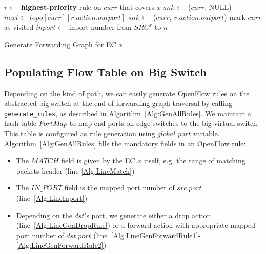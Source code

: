 \begin{algorithm}[t]
\DontPrintSemicolon
{}
 {
         {
                $r \gets$ \textbf{highest-priority} rule on $curr$ that covers $x$\;
                 {\label{Alg:LineDropPath1}
                        $snk \gets$ ($curr$, NULL)\;
                        \;
                        \KwRet\;
                }\label{Alg:LineDropPath2}
                $next \gets topo[curr][r.action.outport]$\;
                 {\label{Alg:LineForwardPath1}
                        $snk \gets$ ($curr$, $r.action.outport$)\;
                        \;
                        \KwRet\;
                }\label{Alg:LineForwardPath2}
                mark $curr$ as visited\;
                \;
        }
}\;
 {\label{Alg:LineStartDFS1}
         {
                $inport \gets$ inport number from $SRC^x$ to $n$\;
                \;
        }
}\label{Alg:LineStartDFS2}
\caption{Generate Forwarding Graph for EC $x$\label{Alg:GenForwardingGraph}}
\end{algorithm}


\subsection{Populating Flow Table on Big Switch}
Depending on the kind of path, we can easily generate OpenFlow rules on the abstracted
big switch at the end of forwarding graph traversal by calling \texttt{generate\_rules},
as described in Algorithm~\ref{Alg:GenAllRules}.
We maintain a hash table $PortMap$ to map end ports on edge switches to the big virtual switch.
This table is configured as rule generation using $global\_port$ variable.
Algorithm~\ref{Alg:GenAllRules} fills the mandatory fields in an OpenFlow rule:
\begin{itemize}
\item The $MATCH$ field is given by the EC $x$ itself, e.g. the range of matching packets header
        (line \ref{Alg:LineMatch})
\item The $IN\_PORT$ field is the mapped port number of $src.port$ (line~\ref{Alg:LineInport})
\item Depending on the $dst$'s port, we generate either a drop action
        (line~\ref{Alg:LineGenDropRule})
        or a forward action with appropriate mapped port number of $dst.port$ 
        (line~\ref{Alg:LineGenForwardRule1}-\ref{Alg:LineGenForwardRule2})
\end{itemize}

